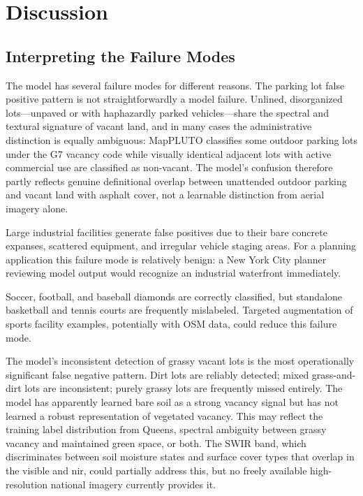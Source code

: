 \chapter{Discussion}
\label{ch:discussion}

\section{Interpreting the Failure Modes}
\label{sec:failure_modes}

The model has several failure modes for different reasons. The parking lot false positive pattern is not straightforwardly a model failure. Unlined, disorganized lots---unpaved or with haphazardly parked vehicles---share the spectral and textural signature of vacant land, and in many cases the administrative distinction is equally ambiguous: MapPLUTO classifies some outdoor parking lots under the G7 vacancy code while visually identical adjacent lots with active commercial use are classified as non-vacant. The model's confusion therefore partly reflects genuine definitional overlap between unattended outdoor parking and vacant land with asphalt cover, not a learnable distinction from aerial imagery alone.

Large industrial facilities generate false positives due to their bare concrete expanses, scattered equipment, and irregular vehicle staging areas. For a planning application this failure mode is relatively benign: a New York City planner reviewing model output would recognize an industrial waterfront immediately.

Soccer, football, and baseball diamonds are correctly classified, but standalone basketball and tennis courts are frequently mislabeled. Targeted augmentation of sports facility examples, potentially with OSM data, could reduce this failure mode.

The model's inconsistent detection of grassy vacant lots is the most operationally significant false negative pattern. Dirt lots are reliably detected; mixed grass-and-dirt lots are inconsistent; purely grassy lots are frequently missed entirely. The model has apparently learned bare soil as a strong vacancy signal but has not learned a robust representation of vegetated vacancy. This may reflect the training label distribution from Queens, spectral ambiguity between grassy vacancy and maintained green space, or both. The SWIR band, which discriminates between soil moisture states and surface cover types that overlap in the visible and \acrshort{nir}, could partially address this, but no freely available high-resolution national imagery currently provides it.

